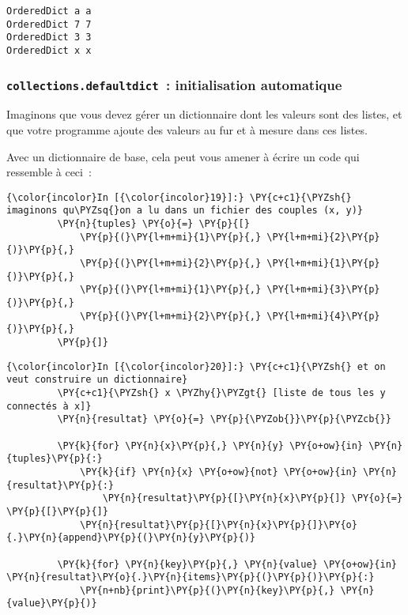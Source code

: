     \begin{Verbatim}[commandchars=\\\{\}]
OrderedDict a a
OrderedDict 7 7
OrderedDict 3 3
OrderedDict x x

    \end{Verbatim}

    \hypertarget{collections.defaultdict-initialisation-automatique}{%
\subsubsection{\texorpdfstring{\texttt{collections.defaultdict}~:
initialisation
automatique}{collections.defaultdict~: initialisation automatique}}\label{collections.defaultdict-initialisation-automatique}}

    Imaginons que vous devez gérer un dictionnaire dont les valeurs sont des
listes, et que votre programme ajoute des valeurs au fur et à mesure
dans ces listes.

Avec un dictionnaire de base, cela peut vous amener à écrire un code qui
ressemble à ceci~:

    \begin{Verbatim}[commandchars=\\\{\}]
{\color{incolor}In [{\color{incolor}19}]:} \PY{c+c1}{\PYZsh{} imaginons qu\PYZsq{}on a lu dans un fichier des couples (x, y)}
         \PY{n}{tuples} \PY{o}{=} \PY{p}{[}
             \PY{p}{(}\PY{l+m+mi}{1}\PY{p}{,} \PY{l+m+mi}{2}\PY{p}{)}\PY{p}{,}
             \PY{p}{(}\PY{l+m+mi}{2}\PY{p}{,} \PY{l+m+mi}{1}\PY{p}{)}\PY{p}{,}
             \PY{p}{(}\PY{l+m+mi}{1}\PY{p}{,} \PY{l+m+mi}{3}\PY{p}{)}\PY{p}{,}
             \PY{p}{(}\PY{l+m+mi}{2}\PY{p}{,} \PY{l+m+mi}{4}\PY{p}{)}\PY{p}{,}
         \PY{p}{]}
\end{Verbatim}


    \begin{Verbatim}[commandchars=\\\{\}]
{\color{incolor}In [{\color{incolor}20}]:} \PY{c+c1}{\PYZsh{} et on veut construire un dictionnaire}
         \PY{c+c1}{\PYZsh{} x \PYZhy{}\PYZgt{} [liste de tous les y connectés à x]}
         \PY{n}{resultat} \PY{o}{=} \PY{p}{\PYZob{}}\PY{p}{\PYZcb{}}
         
         \PY{k}{for} \PY{n}{x}\PY{p}{,} \PY{n}{y} \PY{o+ow}{in} \PY{n}{tuples}\PY{p}{:}
             \PY{k}{if} \PY{n}{x} \PY{o+ow}{not} \PY{o+ow}{in} \PY{n}{resultat}\PY{p}{:}
                 \PY{n}{resultat}\PY{p}{[}\PY{n}{x}\PY{p}{]} \PY{o}{=} \PY{p}{[}\PY{p}{]}
             \PY{n}{resultat}\PY{p}{[}\PY{n}{x}\PY{p}{]}\PY{o}{.}\PY{n}{append}\PY{p}{(}\PY{n}{y}\PY{p}{)}
         
         \PY{k}{for} \PY{n}{key}\PY{p}{,} \PY{n}{value} \PY{o+ow}{in} \PY{n}{resultat}\PY{o}{.}\PY{n}{items}\PY{p}{(}\PY{p}{)}\PY{p}{:}
             \PY{n+nb}{print}\PY{p}{(}\PY{n}{key}\PY{p}{,} \PY{n}{value}\PY{p}{)}
\end{Verbatim}


